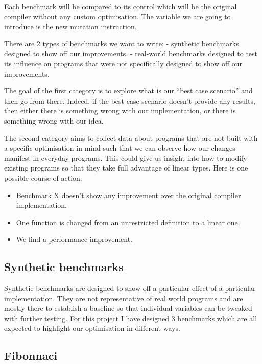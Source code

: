 \documentclass[
]{article}
\providecommand{\tightlist}{%
  \setlength{\itemsep}{0pt}\setlength{\parskip}{0pt}}
\begin{document}
Each benchmark will be compared to its control which will be the
original compiler without any custom optimisation. The variable we are
going to introduce is the new mutation instruction.

There are 2 types of benchmarks we want to write: - synthetic benchmarks
designed to show off our improvements. - real-world benchmarks designed
to test its influence on programs that were not specifically designed to
show off our improvements.

The goal of the first category is to explore what is our ``best case
scenario'' and then go from there. Indeed, if the best case scenario
doesn't provide any results, then either there is something wrong with
our implementation, or there is something wrong with our idea.

The second category aims to collect data about programs that are not
built with a specific optimisation in mind such that we can observe how
our changes manifest in everyday programs. This could give us insight
into how to modify existing programs so that they take full advantage of
linear types. Here is one possible course of action:

\begin{itemize}
\tightlist
\item
  Benchmark X doesn't show any improvement over the original compiler
  implementation.
\item
  One function is changed from an unrestricted definition to a linear
  one.
\item
  We find a performance improvement.
\end{itemize}

\hypertarget{synthetic-benchmarks}{%
\subsection{Synthetic benchmarks}\label{synthetic-benchmarks}}

Synthetic benchmarks are designed to show off a particular effect of a
particular implementation. They are not representative of real world
programs and are mostly there to establish a baseline so that individual
variables can be tweaked with further testing. For this project I have
designed 3 benchmarks which are all expected to highlight our
optimisation in different ways.

\hypertarget{fibonnaci}{%
\subsection{Fibonnaci}\label{fibonnaci}}
\end{document}
